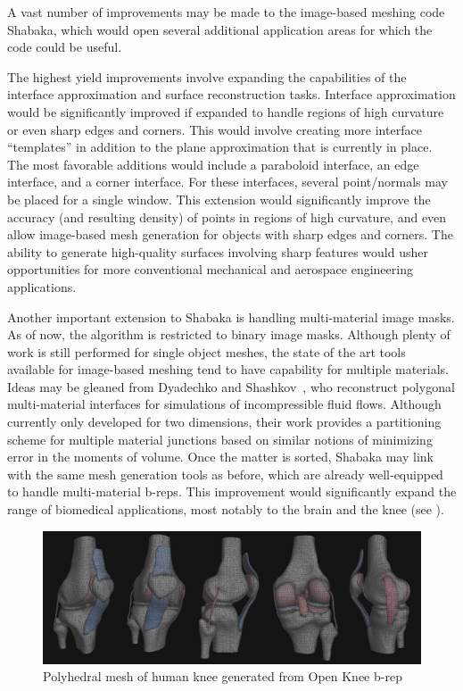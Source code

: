 A vast number of improvements may be made to the image-based meshing code Shabaka, which would open several additional application areas for which the code could be useful.

The highest yield improvements involve expanding the capabilities of the interface approximation and surface reconstruction tasks. Interface approximation would be significantly improved if expanded to handle regions of high curvature or even sharp edges and corners. This would involve creating more interface ``templates'' in addition to the plane approximation that is currently in place. The most favorable additions would include a paraboloid interface, an edge interface, and a corner interface. For these interfaces, several point/normals may be placed for a single window. This extension would significantly improve the accuracy (and resulting density) of points in regions of high curvature, and even allow image-based mesh generation for objects with sharp edges and corners. The ability to generate high-quality surfaces involving sharp features would usher opportunities for more conventional mechanical and aerospace engineering applications.

Another important extension to Shabaka is handling multi-material image masks. As of now, the algorithm is restricted to binary image masks. Although plenty of work is still performed for single object meshes, the state of the art tools available for image-based meshing tend to have capability for multiple materials. Ideas may be gleaned from Dyadechko and Shashkov~\cite{dyadechko_2008}, who reconstruct polygonal multi-material interfaces for simulations of incompressible fluid flows. Although currently only developed for two dimensions, their work provides a partitioning scheme for multiple material junctions based on similar notions of minimizing error in the moments of volume. Once the matter is sorted, Shabaka may link with the same mesh generation tools as before, which are already well-equipped to handle multi-material b-reps. This improvement would significantly expand the range of biomedical applications, most notably to the brain and the knee (see ).

\begin{figure}
\centering
		\includegraphics[width=1.0\textwidth]{media/7-polyknee/fullmesh.png}
%
\caption{Polyhedral mesh of human knee generated from Open Knee b-rep~\cite{erdemir_2015}}
\label{fig:polyknee}
\end{figure}


